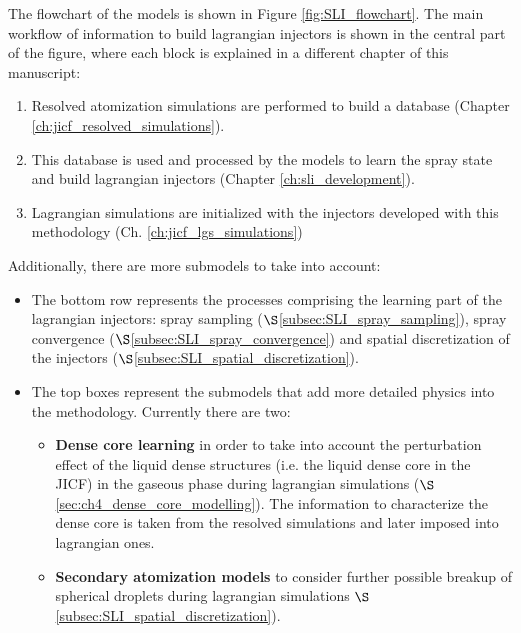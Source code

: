 The flowchart of the models is shown in Figure \ref{fig:SLI_flowchart}. The main workflow of information to build lagrangian injectors is shown in the central part of the figure, where each block is explained in a different chapter of this manuscript:


\begin{enumerate}

	\item Resolved atomization simulations are performed to build a database (Chapter \ref{ch:jicf_resolved_simulations}).
	
	\item This database is used and processed by the models to learn the spray state and build lagrangian injectors (Chapter \ref{ch:sli_development}).
	
	\item Lagrangian simulations are initialized with the injectors developed with this methodology (Ch. \ref{ch:jicf_lgs_simulations}) 


\end{enumerate}

Additionally, there are more submodels to take into account:

\begin{itemize}

	\item The bottom row represents the processes comprising the learning part of the lagrangian injectors: spray sampling ($\S$\ref{subsec:SLI_spray_sampling}), spray convergence ($\S$\ref{subsec:SLI_spray_convergence}) and spatial discretization of the injectors ($\S$\ref{subsec:SLI_spatial_discretization}).
	
	\item The top boxes represent the submodels that add more detailed physics into the methodology. Currently there are two: 
	
	\begin{itemize}
	
		\item \textbf{Dense core learning} in order to take into account the perturbation effect of the liquid dense structures (i.e. the liquid dense core in the JICF) in the gaseous phase during lagrangian simulations ($\S$\ref{sec:ch4_dense_core_modelling}). The information to characterize the dense core is taken from the resolved simulations and later imposed into lagrangian ones.
		
		\item \textbf{Secondary atomization models} to consider further possible breakup of spherical droplets during lagrangian simulations $\S$ \ref{subsec:SLI_spatial_discretization}).
		
	\end{itemize}


\end{itemize}



